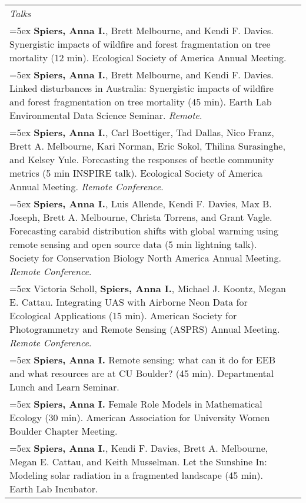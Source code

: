 \begin{longtable}{@{}>{\raggedright}p{5.25in} @{} >{\raggedleft}X@{}}

\emph{Talks}  \tabularnewline

\hangindent=5ex \textbf{Spiers, Anna I.}, Brett Melbourne, and Kendi F. Davies. Synergistic impacts of wildfire and forest fragmentation on tree mortality (12 min). Ecological Society of America Annual Meeting. & 2023 \tabularnewline %

\hangindent=5ex \textbf{Spiers, Anna I.}, Brett Melbourne, and Kendi F. Davies. Linked disturbances in Australia: Synergistic impacts of wildfire and forest fragmentation on tree mortality (45 min). Earth Lab Environmental Data Science Seminar. \emph{Remote}. & 2022 \tabularnewline %

\hangindent=5ex \textbf{Spiers, Anna I.}, Carl Boettiger, Tad Dallas, Nico Franz, Brett A. Melbourne, Kari Norman, Eric Sokol, Thilina Surasinghe, and Kelsey Yule. Forecasting the responses of beetle community metrics (5 min INSPIRE talk). Ecological Society of America Annual Meeting. \emph{Remote Conference}. & 2021 \tabularnewline %

\hangindent=5ex \textbf{Spiers, Anna I.}, Luis Allende, Kendi F. Davies, Max B. Joseph, Brett A. Melbourne, Christa Torrens, and Grant Vagle. Forecasting carabid distribution shifts with global warming using remote sensing and open source data (5 min lightning talk). Society for Conservation Biology North America Annual Meeting. \emph{Remote Conference}. & 2020 \tabularnewline %

\hangindent=5ex Victoria Scholl, \textbf{Spiers, Anna I.}, Michael J. Koontz, Megan E. Cattau. Integrating UAS with Airborne Neon Data for Ecological Applications (15 min).  American Society for Photogrammetry and Remote Sensing (ASPRS) Annual Meeting. \emph{Remote Conference}. & 2020 \tabularnewline %

\hangindent=5ex \textbf{Spiers, Anna I.} Remote sensing: what can it do for EEB and what resources are at CU Boulder? (45 min). Departmental Lunch and Learn Seminar. & 2019 \tabularnewline %

\hangindent=5ex \textbf{Spiers, Anna I.} Female Role Models in Mathematical Ecology (30 min). American Association for University Women Boulder Chapter Meeting. & 2019 \tabularnewline %

\hangindent=5ex \textbf{Spiers, Anna I.}, Kendi F. Davies, Brett A. Melbourne, Megan E. Cattau, and Keith Musselman. Let the Sunshine In: Modeling solar radiation in a fragmented landscape (45 min). Earth Lab Incubator. &  2019 \tabularnewline %


\end{longtable}
